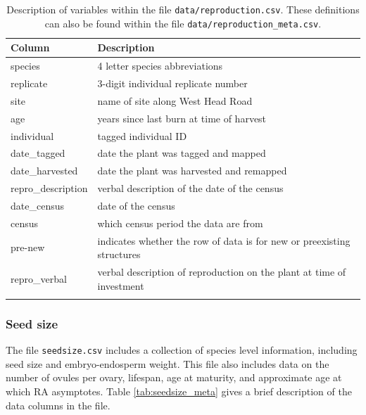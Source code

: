 \documentclass[10pt,twoside]{article}\usepackage[]{graphicx}\usepackage[]{color}
\begin{document}
\begingroup\small
\begin{longtable}{p{6cm}p{10cm}}
\caption{Description of variables within the file \texttt{data/reproduction.csv}. These definitions can also be found within the file \texttt{data/reproduction\_meta.csv}.} \\ 
  \hline
Column & Description \\ 
  \hline
species & 4 letter species abbreviations \\ 
  replicate & 3-digit individual replicate number \\ 
  site & name of site along West Head Road \\ 
  age & years since last burn at time of harvest \\ 
  individual & tagged individual ID \\ 
  date\_tagged & date the plant was tagged and mapped \\ 
  date\_harvested & date the plant was harvested and remapped \\ 
  repro\_description & verbal description of the date of the census \\ 
  date\_census & date of the census \\ 
  census & which census period the data are from \\ 
  pre-new & indicates whether the row of data is for new or preexisting structures \\ 
  repro\_verbal & verbal description of reproduction on the plant at time of investment \\ 
   \hline
\hline
\label{tab:reproduction_meta}
\end{longtable}
\endgroup


\subsubsection{Seed size}
The file \texttt{seedsize.csv} includes a collection of species level information, including seed size and embryo-endosperm weight. This file also includes data on the number of ovules per ovary, lifespan, age at maturity, and approximate age at which RA asymptotes. Table \ref{tab:seedsize_meta} gives a brief description of the data columns in the file.
\end{document}
